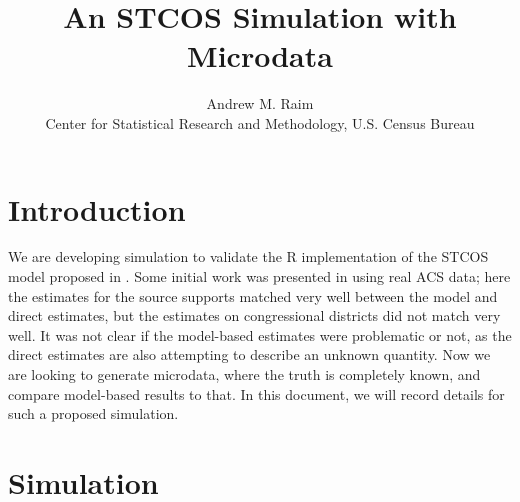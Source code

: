 \documentclass[12pt]{article}
\title{An STCOS Simulation with Microdata}
\author{Andrew M. Raim
\vspace{0.5em} \\
Center for Statistical Research and Methodology, U.S. Census Bureau
}
\begin{document}
\maketitle

\section{Introduction}
\label{sec:intro}
We are developing simulation to validate the R implementation of the STCOS model proposed in \citet{BradleyEtAl2016-STAT}. Some initial work was presented in \citet{JSM2017-STCOS} using real ACS data; here the estimates for the source supports matched very well between the model and direct estimates, but the estimates on congressional districts did not match very well. It was not clear if the model-based estimates were problematic or not, as the direct estimates are also attempting to describe an unknown quantity. Now we are looking to generate microdata, where the truth is completely known, and compare model-based results to that. In this document, we will record details for such a proposed simulation.

\section{Simulation}
\label{sec:sim}
\end{document}
